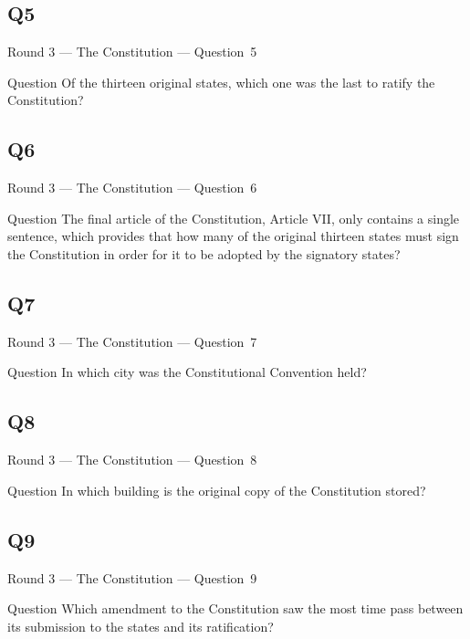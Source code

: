 \documentclass[11pt]{beamer}
\begin{document}
\subsection*{Q5}
\begin{frame}[t]{Round 3 --- The Constitution --- \mbox{Question 5}}
\vspace{-0.5em}
\begin{block}{Question}
Of the thirteen original states, which one was the last to ratify the Constitution?
\end{block}
\end{frame}
\subsection*{Q6}
\begin{frame}[t]{Round 3 --- The Constitution --- \mbox{Question 6}}
\vspace{-0.5em}
\begin{block}{Question}
The final article of the Constitution, Article VII, only contains a single sentence, which provides that how many of the original thirteen states must sign the Constitution in order for it to be adopted by the signatory states?
\end{block}
\end{frame}
\subsection*{Q7}
\begin{frame}[t]{Round 3 --- The Constitution --- \mbox{Question 7}}
\vspace{-0.5em}
\begin{block}{Question}
In which city was the Constitutional Convention held?
\end{block}
\end{frame}
\subsection*{Q8}
\begin{frame}[t]{Round 3 --- The Constitution --- \mbox{Question 8}}
\vspace{-0.5em}
\begin{block}{Question}
In which building is the original copy of the Constitution stored?
\end{block}
\end{frame}
\subsection*{Q9}
\begin{frame}[t]{Round 3 --- The Constitution --- \mbox{Question 9}}
\vspace{-0.5em}
\begin{block}{Question}
Which amendment to the Constitution saw the most time pass between its submission to the states and its ratification?
\end{block}
\end{frame}
\end{document}
